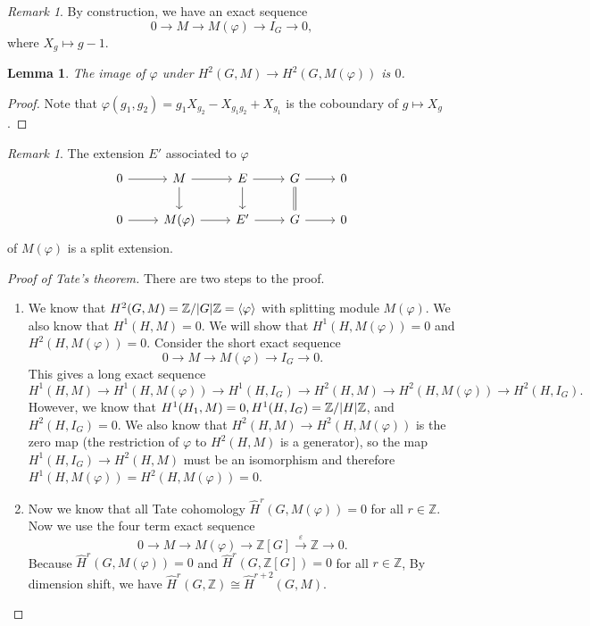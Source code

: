\documentclass[leqno, openany]{memoir}
\newtheorem{lem}[thm]{Lemma}
\theoremstyle{definition}
\theoremstyle{remark}
\newtheorem{rmk}[thm]{Remark}
\theoremstyle{plain}
\theoremstyle{definition}
\theoremstyle{remark}
\newcommand{\Z}{\mathbb{Z}}
\newcommand{\ep}{\varepsilon}
\newcommand{\wh}[1]{\widehat{#1}}
\begin{document}
\begin{rmk}
    By construction, we have an exact sequence
    \[ 0 \to M \to M(\varphi) \to I_G \to 0, \]
    where $X_g \mapsto g-1$.
\end{rmk}

\begin{lem}
    The image of $\varphi$ under $H^2(G, M) \to H^2(G, M(\varphi))$ is $0$.
\end{lem}

\begin{proof}
    Note that $\varphi(g_1,g_2) = g_1 X_{g_2} - X_{g_1g_2} + X_{g_1}$ is the coboundary of $g \mapsto X_g$.
\end{proof}

\begin{rmk}
    The extension $E'$ associated to $\varphi$
    \begin{equation*}
    \begin{tikzcd}
        0 \ar{r} & M \ar{r} \ar{d} & E \ar{r} \ar{d} & G \ar{r} \ar[equals]{d} & 0 \\
        0 \ar{r} & M(\varphi) \ar{r} & E' \ar{r} & G \ar{r} & 0
    \end{tikzcd}
    \end{equation*}
    of $M(\varphi)$ is a split extension.
\end{rmk}

\begin{proof}[Proof of Tate's theorem]
    There are two steps to the proof.
    \begin{enumerate}
        \item We know that $H^2(G, M) = \Z/\abs{G}\Z = \ev{\varphi}$ with splitting module $M(\varphi)$. We also know that $H^1(H, M) = 0$. We will show that $H^1(H, M(\varphi)) = 0$ and $H^2(H, M(\varphi)) = 0$. Consider the short exact sequence
            \[ 0 \to M \to M(\varphi) \to I_G \to 0. \]
            This gives a long exact sequence
            \[ H^1(H, M) \to H^1(H, M(\varphi)) \to H^1(H, I_G) \to H^2(H, M) \to H^2(H, M(\varphi)) \to H^2(H, I_G). \]
            However, we know that $H^1(H_1, M) = 0, H^1(H, I_G) = \Z/\abs{H} \Z$, and $H^2(H, I_G) = 0$. We also know that $H^2(H, M) \to H^2(H, M(\varphi))$ is the zero map (the restriction of $\varphi$ to $H^2(H, M)$ is a generator), so the map $H^1(H, I_G) \to H^2(H, M)$ must be an isomorphism and therefore $H^1(H, M(\varphi)) = H^2(H, M(\varphi)) = 0$.
        \item Now we know that all Tate cohomology $\wh{H}^r(G, M(\varphi)) = 0$ for all $r \in \Z$. Now we use the four term exact sequence
            \[ 0 \to M \to M(\varphi) \to \Z[G] \xrightarrow{\ep} \Z \to 0. \]
            Because $\wh{H}^r(G, M(\varphi)) = 0$ and $\wh{H}^r(G, \Z[G]) = 0$ for all $r \in \Z$, By dimension shift, we have $\wh{H}^r(G, \Z) \cong \wh{H}^{r+2}(G, M)$. \qedhere
    \end{enumerate}
\end{proof}
\end{document}
